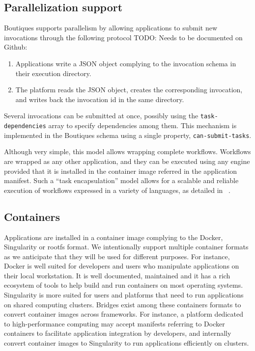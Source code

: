 \documentclass{article}
\newcommand{\todo}[1]{\color{red}TODO: #1\color{black}}
\newcommand{\boutiques}{Boutiques\xspace}
\begin{document}
\subsection{Parallelization support}
\label{sec:parallelization}
\boutiques supports parallelism by allowing applications to submit new
invocations through the following protocol \todo{Needs to be
  documented on Github}:
\begin{enumerate}
\item Applications write a JSON object complying to the invocation
  schema in their execution directory.
\item The platform reads the JSON object, creates the corresponding
  invocation, and writes back the invocation id in the same directory.
\end{enumerate}
Several invocations can be submitted at once, possibly using the
\texttt{task-dependencies} array to specify dependencies among
them. This mechanism is implemented in the Boutiques schema using a
single property, \texttt{can-submit-tasks}.

Although very simple, this model allows wrapping complete
workflows. Workflows are wrapped as any other application, and they
can be executed using any engine provided that it is installed in the
container image referred in the application manifest. Such a ``task
encapsulation'' model allows for a scalable and reliable execution of
workflows expressed in a variety of languages, as detailed in
~\cite{glatard2016fgcs}.

\subsection{Containers}

Applications are installed in a container image complying to the
Docker, Singularity or rootfs format. We intentionally support
multiple container formats as we anticipate that they will be used for
different purposes. For instance, Docker is well suited for developers
and users who manipulate applications on their local workstation. It
is well documented, maintained and it has a rich ecosystem of tools to
help build and run containers on most operating systems. Singularity
is more suited for users and platforms that need to run applications
on shared computing clusters. Bridges exist among these containers
formats to convert container images across frameworks. For instance, a
platform dedicated to high-performance computing may accept manifests
referring to Docker containers to facilitate application integration
by developers, and internally convert container images to Singularity
to run applications efficiently on clusters.
\end{document}
